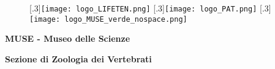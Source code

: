 \documentclass[10pt,twoside,openany,x11names,svgnames,italian,a5paper,dvipsnames,table]{memoir}
\newcommand{\chaptercolor}{LightGreen}
\newcommand{\backpagecolor}{\chaptercolor}
\begin{document}
\begin{thebibliography}{9}


\end{thebibliography}
\endgroup

  
\newpage
\normalsize
\enlargethispage{3\baselineskip}
\thispagestyle{empty}
\pagecolor{\backpagecolor}
\begin{center}
\vspace*{\fill}

\begin{figure}[htp]
\captionsetup{font=normalsize}
\centering
{}[.3\linewidth]{\texttt{[image: logo\_LIFETEN.png]}}
[.3\linewidth]{\texttt{[image: logo\_PAT.png]}}
[.3\linewidth]{\texttt{[image: logo\_MUSE\_verde\_nospace.png]}}
\end{figure}
\textbf{\textcolor{LightGoldenrod!50!Gold}{MUSE - Museo delle Scienze}}

\vspace*{\baselineskip}

\textbf{\textcolor{LightGoldenrod}{Sezione di Zoologia dei Vertebrati}}
\end{center}
\end{document}

